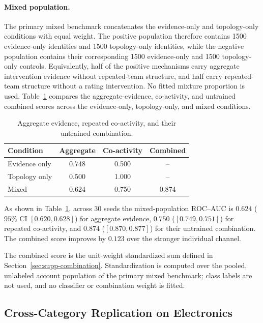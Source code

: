\paragraph{Mixed population.}
The primary mixed benchmark concatenates the evidence-only and topology-only
conditions with equal weight. The positive population therefore contains 1500
evidence-only identities and 1500 topology-only identities, while the negative
population contains their corresponding 1500 evidence-only and 1500
topology-only controls. Equivalently, half of the positive mechanisms carry
aggregate intervention evidence without repeated-team structure, and half
carry repeated-team structure without a rating intervention. No fitted mixture
proportion is used. Table~\ref{tab:supp-complementarity} compares the aggregate-evidence,
co-activity, and untrained combined scores across the evidence-only,
topology-only, and mixed conditions.

\begin{table}[t]
\caption{Aggregate evidence, repeated co-activity, and their untrained
combination.}
\label{tab:supp-complementarity}
\centering
\small
\setlength{\tabcolsep}{4pt}
\begin{tabular}{@{}lccc@{}}
\toprule
Condition & Aggregate & Co-activity & Combined \\
\midrule
Evidence only & 0.748 & 0.500 & -- \\
Topology only & 0.500 & 1.000 & -- \\
Mixed & 0.624 & 0.750 & 0.874 \\
\bottomrule
\end{tabular}
\end{table}

As shown in Table~\ref{tab:supp-complementarity}, across 30 seeds the mixed-population ROC--AUC is $0.624$ ($95\%$ CI $[0.620,0.628]$) for aggregate evidence, $0.750$ ($[0.749,0.751]$) for repeated co-activity, and $0.874$ ($[0.870,0.877]$) for their untrained combination. The combined score improves by $0.123$ over the stronger individual channel.


The combined score is the unit-weight standardized sum defined in
Section~\ref{sec:supp-combination}. Standardization is computed over the
pooled, unlabeled account population of the primary mixed benchmark; class
labels are not used, and no classifier or combination weight is fitted.


\subsection{Cross-Category Replication on Electronics}
\label{sec:supp-electronics}

